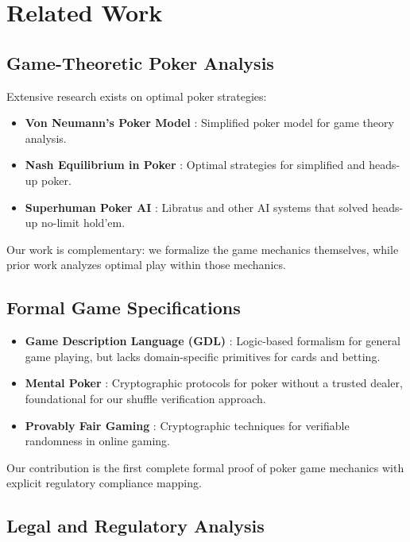 \documentclass[11pt,a4paper]{article}
\begin{document}
\section{Related Work}
\label{sec:related}

\subsection{Game-Theoretic Poker Analysis}

Extensive research exists on optimal poker strategies:
\begin{itemize}
    \item \textbf{Von Neumann's Poker Model} \cite{vonneumann1944theory}: Simplified poker model for game theory analysis.
    \item \textbf{Nash Equilibrium in Poker} \cite{ferguson2003endgame, chen2007exploitability}: Optimal strategies for simplified and heads-up poker.
    \item \textbf{Superhuman Poker AI} \cite{bowling2015heads}: Libratus and other AI systems that solved heads-up no-limit hold'em.
\end{itemize}

Our work is complementary: we formalize the game mechanics themselves, while prior work analyzes optimal play within those mechanics.

\subsection{Formal Game Specifications}

\begin{itemize}
    \item \textbf{Game Description Language (GDL)} \cite{love2008general}: Logic-based formalism for general game playing, but lacks domain-specific primitives for cards and betting.
    \item \textbf{Mental Poker} \cite{shamir1981mental}: Cryptographic protocols for poker without a trusted dealer, foundational for our shuffle verification approach.
    \item \textbf{Provably Fair Gaming} \cite{bonneau2015bitcoin}: Cryptographic techniques for verifiable randomness in online gaming.
\end{itemize}

Our contribution is the first complete formal proof of poker game mechanics with explicit regulatory compliance mapping.

\subsection{Legal and Regulatory Analysis}
\end{document}
